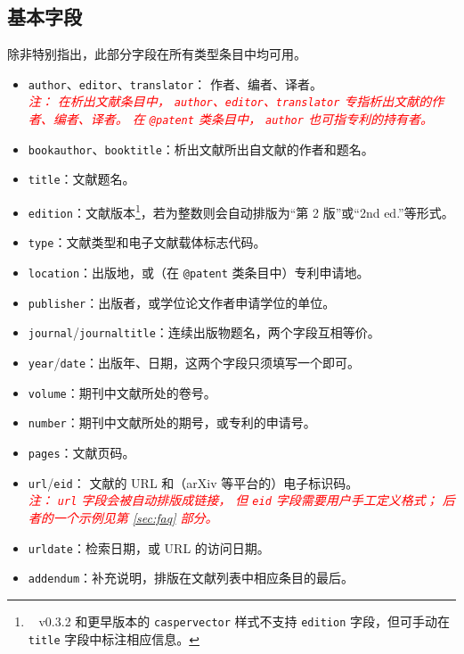 \documentclass[UTF8]{ctexart}
\newcommand*{\cupercite}[1]{\supercite{#1}\mbox{}}
\newcommand{\myemph}[1]{\emph{\textcolor{red}{#1}}}
\begin{document}
\subsection{基本字段}

除非特别指出，此部分字段在所有类型条目中均可用。

\begin{itemize}
	\item \verb|author|、\verb|editor|、\verb|translator|：
		作者、编者、译者。\\\myemph{%
			注：
			在析出文献条目中，%
			\texttt{author}、\texttt{editor}、\texttt{translator}
			专指析出文献的作者、编者、译者。
			在 \texttt{@patent} 类条目中，%
			\texttt{author} 也可指专利的持有者。%
		}
	\item \verb|bookauthor|、\verb|booktitle|：析出文献所出自文献的作者和题名。
	\item \verb|title|：文献题名。
	\item \verb|edition|：文献版本\footnote{\ %
		v0.3.2 和更早版本的 \texttt{caspervector} 样式不支持 \texttt{edition}
		字段，但可手动在 \texttt{title} 字段中标注相应信息。%
	}，若为整数则会自动排版为“第 2 版”或“2nd ed.”等形式。
	\item \verb|type|：文献类型和电子文献载体标志代码\cupercite{gbt7714-2005}。
	\item \verb|location|：出版地，或（在 \verb|@patent| 类条目中）专利申请地。
	\item \verb|publisher|：出版者，或学位论文作者申请学位的单位。
	\item \verb|journal|/\verb|journaltitle|：连续出版物题名，两个字段互相等价。
	\item \verb|year|/\verb|date|：出版年、日期，这两个字段只须填写一个即可。
	\item \verb|volume|：期刊中文献所处的卷号。
	\item \verb|number|：期刊中文献所处的期号，或专利的申请号。
	\item \verb|pages|：文献页码。
	\item \verb|url|/\verb|eid|：
		文献的 URL 和（arXiv 等平台的）电子标识码。\\\myemph{%
			注：%
			\texttt{url} 字段会被自动排版成链接，
			但 \texttt{eid} 字段需要用户手工定义格式；
			后者的一个示例见第 \ref{sec:faq} 部分。%
		}
	\item \verb|urldate|：检索日期，或 URL 的访问日期。
	\item \verb|addendum|：补充说明，排版在文献列表中相应条目的最后。
\end{itemize}
\end{document}
